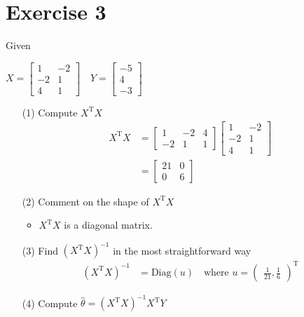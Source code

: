 \documentclass[12pt,a4paper]{article}
\begin{document}
\section*{Exercise 3}
Given 
\begin{center}
$
	X  = 
	\begin{bmatrix}
		1 & -2 \\
		-2 & 1\\
		4 & 1
	\end{bmatrix} \quad 
	Y = \begin{bmatrix}
			-5 \\
			4\\
			-3
	\end{bmatrix}
	$
\end{center}
\begin{enumerate}
	\item[(1)] Compute $X^{\text{T}}X$
			\begin{align*}
						X^{\text{T}}X &=  
						\begin{bmatrix}
							1 & -2 & 4 \\
							-2 & 1 & 1
						\end{bmatrix}
					 	\begin{bmatrix}
								1 & -2 \\
								-2 & 1\\
							4 & 1
						\end{bmatrix}\\
						&=  \begin{bmatrix}
								21 & 0\\
								0 & 6
						\end{bmatrix}
			\end{align*}
		\item[(2)] Comment on the shape of $X^{\text{T}}X $
				\begin{itemize}
						\item $X^{\text{T}}X $ is a diagonal matrix.
				\end{itemize}
		\item[(3)] Find  $(X^{\text{T}}X)^{-1} $ in the most straightforward way
					\begin{align*}
							(X^{\text{T}}X)^{-1}  &=  \text{Diag}(u) \quad  \text{where }  u= \begin{pmatrix}
						\frac{1}{21} , \frac{1}{6}		
							\end{pmatrix}^{\text{T}}							 
					\end{align*}
		\item[(4)] Compute $\hat{\theta} =( X^{\text{T}}X)^{-1} X^{\text{T}}Y $ 

\end{enumerate}
\end{document}
